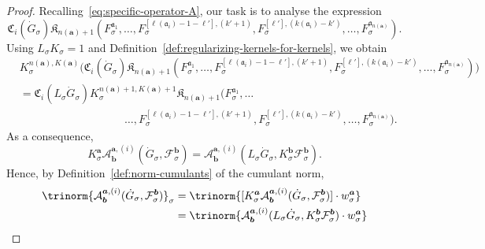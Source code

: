\documentclass{article}
\numberwithin{equation}{section}
\theoremstyle{plain}
\theoremstyle{definition}
\begin{document}
\begin{proof}
  Recalling~\eqref{eq:specific-operator-A}, our task is to analyse the
  expression
  \[  \mathfrak{C}_i (\dot{G}_{\sigma}) \mathfrak{K}_{n
     (\boldsymbol{a}) + 1} (F_{\sigma}^{\mathfrak{a}_1}, \ldots,
     F_{\sigma}^{[\ell (\mathfrak{a}_i) - 1 - \ell'], (k' + 1)},
     F_{\sigma}^{[\ell'], (k (\mathfrak{a}_i) - k')}, \ldots,
     F_{\sigma}^{\mathfrak{a}_{n (\boldsymbol{a})}}) . \]
  Using $L_{\sigma} K_{\sigma} = 1$ and
  Definition~\ref{def:regularizing-kernels-for-kernels}, we obtain
  \begin{align*}
 &K_{\sigma}^{n (\boldsymbol{a}), K (\boldsymbol{a})}
    \bigl(\mathfrak{C}_i (\dot{G}_{\sigma})
    \mathfrak{K}_{n(\boldsymbol{a}) + 1} (F_{\sigma}^{\mathfrak{a}_1}, \ldots,
    F_{\sigma}^{[\ell (\mathfrak{a}_i) - 1 - \ell'], (k' + 1)},
    F_{\sigma}^{[\ell'], (k (\mathfrak{a}_i) - k')}, \ldots,
    F_{\sigma}^{\mathfrak{a}_{n (\boldsymbol{a})}})\bigr)\\
  &= \mathfrak{C}_i (L_{\sigma} \dot{G}_{\sigma})
    K_{\sigma}^{n (\boldsymbol{a}) + 1, K (\boldsymbol{a}) + 1} \mathfrak{K}_{n(\boldsymbol{a}) + 1}
    (F_{\sigma}^{\mathfrak{a}_1}, \ldots
    \\
    &\hspace{4cm}\ldots,
    F_{\sigma}^{[\ell (\mathfrak{a}_i) - 1 - \ell'], (k' + 1)},
    F_{\sigma}^{[\ell'], (k (\mathfrak{a}_i) - k')}, \ldots,
    F_{\sigma}^{\mathfrak{a}_{n (\boldsymbol{a})}}) .
  \end{align*}
  As a consequence,
  \[ K_{\sigma}^{\boldsymbol{a}} \mathcal{A}^{\boldsymbol{a}, (i)}_{\boldsymbol{b}}
     (\dot{G}_{\sigma}, \mathcal{F}^{\boldsymbol{b}}_{\sigma})
     =\mathcal{A}^{\boldsymbol{a}, (i)}_{\boldsymbol{b}} (L_{\sigma}
     \dot{G}_{\sigma}, K_{\sigma}^{\boldsymbol{b}}
     \mathcal{F}^{\boldsymbol{b}}_{\sigma}) . \]
  Hence, by Definition~\ref{def:norm-cumulants} of the cumulant
  norm,
  \[ \begin{aligned}
       \trinorm{ \mathcal{A}^{\boldsymbol{a}, (i)}_{\boldsymbol{b}}
       (\dot{G}_{\sigma}, \mathcal{F}^{\boldsymbol{b}}_{\sigma})
       }_{\sigma} & =  \trinorm{ [K_{\sigma}^{\boldsymbol{a}}
       \mathcal{A}^{\boldsymbol{a}, (i)}_{\boldsymbol{b}} (\dot{G}_{\sigma},
       \mathcal{F}^{\boldsymbol{b}}_{\sigma})] \cdot w_{\sigma}^{\boldsymbol{a}}
       }\\
       & =  \trinorm{ \mathcal{A}^{\boldsymbol{a}, (i)}_{\boldsymbol{b}}
       (L_{\sigma} \dot{G}_{\sigma}, K_{\sigma}^{\boldsymbol{b}}
       \mathcal{F}^{\boldsymbol{b}}_{\sigma}) \cdot w_{\sigma}^{\boldsymbol{a}}
}
\end{aligned}\]
\end{proof}
\end{document}
